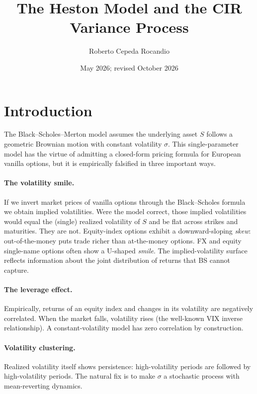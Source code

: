 \documentclass[11pt]{article}
\title{The Heston Model and the CIR Variance Process}
\author{Roberto Cepeda Rocandio}
\date{May 2026; revised October 2026}
\theoremstyle{plain}
\theoremstyle{definition}
\theoremstyle{remark}
\begin{document}
\maketitle
\tableofcontents
\bigskip

\section{Introduction}

The Black--Scholes--Merton model assumes the underlying asset \(S\) follows a geometric Brownian motion with constant volatility \(\sigma\). This single-parameter model has the virtue of admitting a closed-form pricing formula for European vanilla options, but it is empirically falsified in three important ways.

\paragraph{The volatility smile.}
If we invert market prices of vanilla options through the Black--Scholes formula we obtain implied volatilities. Were the model correct, those implied volatilities would equal the (single) realized volatility of \(S\) and be flat across strikes and maturities. They are not. Equity-index options exhibit a downward-sloping \emph{skew}: out-of-the-money puts trade richer than at-the-money options. FX and equity single-name options often show a U-shaped \emph{smile}. The implied-volatility surface reflects information about the joint distribution of returns that BS cannot capture.

\paragraph{The leverage effect.}
Empirically, returns of an equity index and changes in its volatility are negatively correlated. When the market falls, volatility rises (the well-known VIX inverse relationship). A constant-volatility model has zero correlation by construction.

\paragraph{Volatility clustering.}
Realized volatility itself shows persistence: high-volatility periods are followed by high-volatility periods. The natural fix is to make \(\sigma\) a stochastic process with mean-reverting dynamics.
\end{document}
